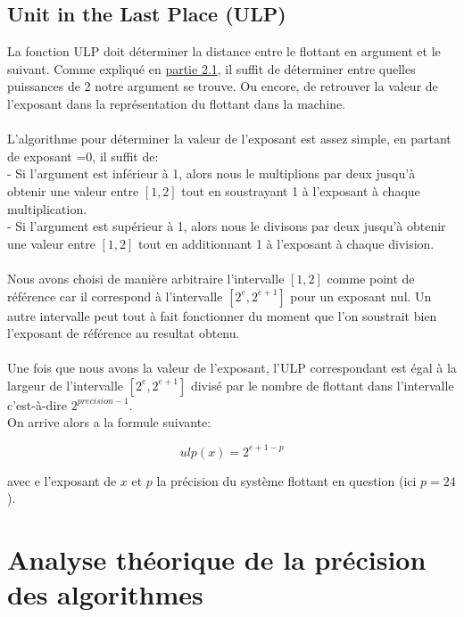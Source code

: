 \documentclass[12pt]{article}
\begin{document}
\subsection{Unit in the Last Place (ULP)}
La fonction ULP doit déterminer la distance entre le flottant en argument et le suivant. Comme
expliqué en \hyperref[sec:notions]{partie 2.1}, il suffit de déterminer entre quelles puissances de 2
notre argument se trouve. Ou encore, de retrouver la valeur de l'exposant dans la représentation
du flottant dans la machine.\\
\\
L'algorithme pour déterminer la valeur de l'exposant est assez simple, en partant de
exposant =0, il suffit de:\\
- Si l'argument est inférieur à 1, alors nous le multiplions par deux jusqu'à obtenir une valeur
entre $[1, 2]$ tout en soustrayant 1 à l'exposant à chaque multiplication.\\
- Si l'argument est supérieur à 1, alors nous le divisons par deux jusqu'à obtenir une valeur
entre $[1, 2]$ tout en additionnant 1 à l'exposant à chaque division.\\
\\
Nous avons choisi de manière arbitraire l'intervalle $[1, 2]$ comme point de référence car il correspond
à l'intervalle $[2^e, 2^{e+1}]$ pour un exposant nul. Un autre intervalle peut tout à fait
fonctionner du moment que l'on soustrait bien l'exposant de référence au resultat obtenu.\\
\\
Une fois que nous avons la valeur de l'exposant, l'ULP correspondant est égal à
la largeur de l'intervalle $[2^e, 2^{e+1}]$ divisé par le nombre de flottant dans l'intervalle
c'est-à-dire $2^{precision - 1}$.\\
On arrive alors a la formule suivante:

\begin{center}
\begin{equation}
  ulp(x) = 2^{e + 1 - p}
\end{equation}
\end{center}
avec e l'exposant de $x$ et $p$ la précision du système flottant en question (ici $p=24$).\\




\section{Analyse théorique de la précision des algorithmes}
\end{document}
